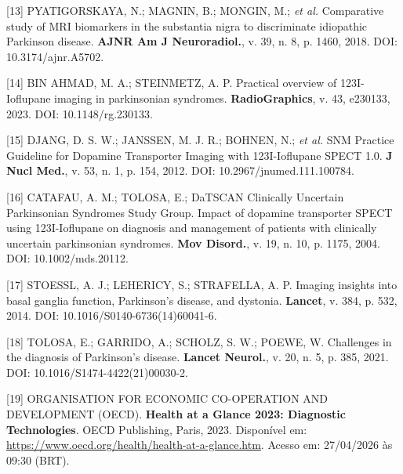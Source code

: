 \documentclass[12pt,a4paper,oneside]{article}
\begin{document}
\begin{singlespace}
\noindent\hangindent=1.25cm\label{ref:pyatigorskaya}
[13] PYATIGORSKAYA, N.; MAGNIN, B.; MONGIN, M.; \textit{et al.}
Comparative study of MRI biomarkers in the substantia nigra to
discriminate idiopathic Parkinson disease. \textbf{AJNR Am J
Neuroradiol.}, v. 39, n. 8, p. 1460, 2018. DOI:
10.3174/ajnr.A5702.\par\smallskip

\noindent\hangindent=1.25cm\label{ref:datspect-rg}
[14] BIN AHMAD, M. A.; STEINMETZ, A. P. Practical overview of
123I-Ioflupane imaging in parkinsonian syndromes.
\textbf{RadioGraphics}, v. 43, e230133, 2023. DOI:
10.1148/rg.230133.\par\smallskip

\noindent\hangindent=1.25cm\label{ref:datspect-jnm}
[15] DJANG, D. S. W.; JANSSEN, M. J. R.; BOHNEN, N.; \textit{et al.}
SNM Practice Guideline for Dopamine Transporter Imaging with
123I-Ioflupane SPECT 1.0. \textbf{J Nucl Med.}, v. 53, n. 1,
p. 154, 2012. DOI: 10.2967/jnumed.111.100784.\par\smallskip

\noindent\hangindent=1.25cm\label{ref:catafau}
[16] CATAFAU, A. M.; TOLOSA, E.; DaTSCAN Clinically Uncertain
Parkinsonian Syndromes Study Group. Impact of dopamine transporter
SPECT using 123I-Ioflupane on diagnosis and management of patients
with clinically uncertain parkinsonian syndromes.
\textbf{Mov Disord.}, v. 19, n. 10, p. 1175, 2004.
DOI: 10.1002/mds.20112.\par\smallskip

\noindent\hangindent=1.25cm\label{ref:radiographics}
[17] STOESSL, A. J.; LEHERICY, S.; STRAFELLA, A. P. Imaging insights
into basal ganglia function, Parkinson's disease, and dystonia.
\textbf{Lancet}, v. 384, p. 532, 2014. DOI:
10.1016/S0140-6736(14)60041-6.\par\smallskip

\noindent\hangindent=1.25cm\label{ref:tolosa}
[18] TOLOSA, E.; GARRIDO, A.; SCHOLZ, S. W.; POEWE, W. Challenges
in the diagnosis of Parkinson's disease. \textbf{Lancet Neurol.},
v. 20, n. 5, p. 385, 2021. DOI:
10.1016/S1474-4422(21)00030-2.\par\smallskip

\noindent\hangindent=1.25cm\label{ref:oecd-mri}
[19] ORGANISATION FOR ECONOMIC CO-OPERATION AND DEVELOPMENT (OECD).
\textbf{Health at a Glance 2023: Diagnostic Technologies}. OECD
Publishing, Paris, 2023. Disponível em:
\url{https://www.oecd.org/health/health-at-a-glance.htm}.
Acesso em: 27/04/2026 às 09:30 (BRT).\par\smallskip


\end{singlespace}
\end{document}
